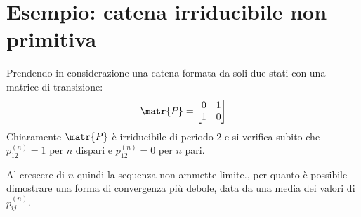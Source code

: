 \documentclass[\main/main.tex]{subfiles}
\begin{document}
\section{Esempio: catena irriducibile non primitiva}
Prendendo in considerazione una catena formata da soli due stati con una matrice di transizione:
\[
  \matr{P} = \begin{bmatrix}
    0 & 1 \\
    1 & 0
  \end{bmatrix}
\]
Chiaramente \(\matr{P}\) è irriducibile di periodo \(2\) e si verifica subito che \(p^{(n)}_{12} = 1\) per \(n\) dispari e \(p^{(n)}_{12} = 0\) per \(n\) pari.

Al crescere di \(n\) quindi la sequenza non ammette limite., per quanto è possibile dimostrare una forma di convergenza più debole, data da una media dei valori di \(p^{(n)}_{ij}\).
\end{document}
